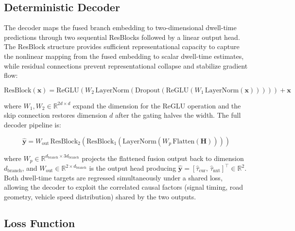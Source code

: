 \documentclass[journal]{IEEEtran}
\begin{document}
\subsection{Deterministic Decoder}
\label{sec.prop.D}

The decoder maps the fused branch embedding to two-dimensional dwell-time predictions through two sequential ResBlocks followed by a linear output head.
The ResBlock structure provides sufficient representational capacity to capture the nonlinear mapping from the fused embedding to scalar dwell-time estimates, while residual connections prevent representational collapse and stabilize gradient flow:

\begin{equation}
\text{ResBlock}(\mathbf{x}) = \text{ReGLU}\!\left(W_2\, \text{LayerNorm}\!\left(\text{Dropout}\!\left(\text{ReGLU}(W_1\, \text{LayerNorm}(\mathbf{x}))\right)\right)\right) + \mathbf{x}
\label{eq:resblock}
\end{equation}

where $W_1, W_2 \in \mathbb{R}^{2d \times d}$ expand the dimension for the ReGLU operation and the skip connection restores dimension $d$ after the gating halves the width.
The full decoder pipeline is:

\begin{equation}
\hat{\mathbf{y}} = W_\text{out}\, \text{ResBlock}_2\!\left(\text{ResBlock}_1\!\left(\text{LayerNorm}(W_p\, \text{Flatten}(\mathbf{H}))\right)\right)
\label{eq:decoder}
\end{equation}

where $W_p \in \mathbb{R}^{d_\text{branch} \times 3d_\text{branch}}$ projects the flattened fusion output back to dimension $d_\text{branch}$, and $W_\text{out} \in \mathbb{R}^{2 \times d_\text{branch}}$ is the output head producing $\hat{\mathbf{y}} = [\hat{\tau}_\text{cur},\, \hat{\tau}_\text{nxt}]^\top \in \mathbb{R}^2$.
Both dwell-time targets are regressed simultaneously under a shared loss, allowing the decoder to exploit the correlated causal factors (signal timing, road geometry, vehicle speed distribution) shared by the two outputs.

\subsection{Loss Function}
\label{sec.prop.E}
\end{document}
